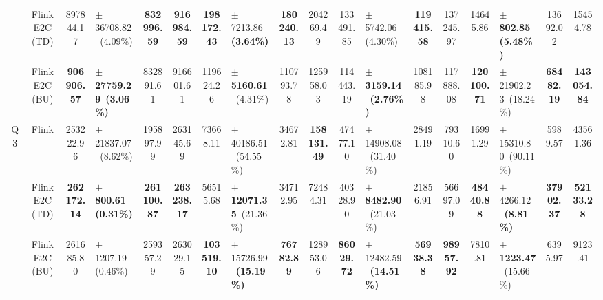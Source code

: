 \begin{tabular}{@{} c c c l c c c l c c c l c c c l c c @{}}
   & FlinkE2C (TD) & \num{897844.17} & $\pm$ \num{36708.82}~(\num{4.09}\%) & {\bfseries \num{832996.59}} & {\bfseries \num{916984.59}} & {\bfseries \num{198172.43}} & $\pm$ \num{7213.86}~{\bfseries (\num{3.64}\%)} & {\bfseries \num{180240.13}} & \num{204269.49} & \num{133491.85} & $\pm$ \num{5742.06}~(\num{4.30}\%) & {\bfseries \num{119415.58}} & \num{137245.97} & \num{14645.86} & $\pm$ {\bfseries \num{802.85}}~{\bfseries (\num{5.48}\%)} & \num{13692.02} & \num{15454.78} \\
   & FlinkE2C (BU) & {\bfseries \num{906906.57}} & $\pm$ {\bfseries \num{27759.29}}~{\bfseries (\num{3.06}\%)} & \num{832891.61} & \num{916601.61} & \num{119624.26} & $\pm$ {\bfseries \num{5160.61}}~(\num{4.31}\%) & \num{110793.78} & \num{125958.03} & \num{114443.19} & $\pm$ {\bfseries \num{3159.14}}~{\bfseries (\num{2.76}\%)} & \num{108185.98} & \num{117888.08} & {\bfseries \num{120100.71}} & $\pm$ \num{21902.23}~(\num{18.24}\%) & {\bfseries \num{68482.19}} & {\bfseries \num{143054.84}} \\
  \cmidrule(lr){1-18}
  \multirow{3}{*}{Q3} & Flink & \num{253222.96} & $\pm$ \num{21837.07}~(\num{8.62}\%) & \num{195897.99} & \num{263145.69} & \num{73668.11} & $\pm$ \num{40186.51}~(\num{54.55}\%) & \num{34672.81} & {\bfseries \num{158131.49}} & \num{47477.10} & $\pm$ \num{14908.08}~(\num{31.40}\%) & \num{28491.19} & \num{79310.60} & \num{16991.29} & $\pm$ \num{15310.80}~(\num{90.11}\%) & \num{5989.57} & \num{43561.36} \\
   & FlinkE2C (TD) & {\bfseries \num{262172.14}} & $\pm$ {\bfseries \num{800.61}}~{\bfseries (\num{0.31}\%)} & {\bfseries \num{261100.87}} & {\bfseries \num{263238.17}} & \num{56515.68} & $\pm$ {\bfseries \num{12071.35}}~(\num{21.36}\%) & \num{34712.95} & \num{72484.31} & \num{40328.90} & $\pm$ {\bfseries \num{8482.90}}~(\num{21.03}\%) & \num{21856.91} & \num{56697.09} & {\bfseries \num{48440.88}} & $\pm$ \num{4266.12}~{\bfseries (\num{8.81}\%)} & {\bfseries \num{37902.37}} & {\bfseries \num{52133.28}} \\
   & FlinkE2C (BU) & \num{261685.80} & $\pm$ \num{1207.19}~(\num{0.46}\%) & \num{259357.29} & \num{263029.15} & {\bfseries \num{103519.10}} & $\pm$ \num{15726.99}~{\bfseries (\num{15.19}\%)} & {\bfseries \num{76782.89}} & \num{128953.06} & {\bfseries \num{86029.72}} & $\pm$ \num{12482.59}~{\bfseries (\num{14.51}\%)} & {\bfseries \num{56938.38}} & {\bfseries \num{98957.92}} & \num{7810.81} & $\pm$ {\bfseries \num{1223.47}}~(\num{15.66}\%) & \num{6395.97} & \num{9123.41} \\
  \cmidrule(lr){1-18}

\end{tabular}
